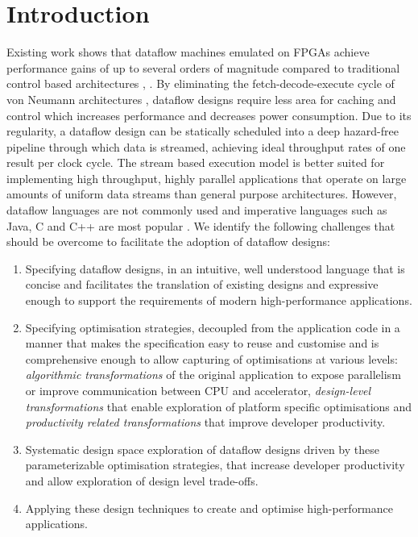 \section{Introduction}

Existing work shows that dataflow machines emulated on FPGAs achieve
performance gains of up to several orders of magnitude compared to
traditional control based architectures \cite{Flynn:Pell:Mencer:2012},
\cite{Mencer:2012}. By eliminating the fetch-decode-execute cycle of
von Neumann architectures \cite{Neumann:1993}, dataflow designs
require less area for caching and control which increases performance
and decreases power consumption. Due to its regularity, a dataflow
design can be statically scheduled into a deep hazard-free pipeline
through which data is streamed, achieving ideal throughput rates of
one result per clock cycle. The stream based execution model is better
suited for implementing high throughput, highly parallel applications
that operate on large amounts of uniform data streams than general
purpose architectures. However, dataflow languages are not commonly
used and imperative languages such as Java, C and C++ are most popular
\cite{Tiobe:2012}. We identify the following challenges that should be
overcome to facilitate the adoption of dataflow designs:
\begin{enumerate}
\item Specifying dataflow designs, in an intuitive, well understood
  language that is concise and facilitates the translation of existing
  designs and expressive enough to support the requirements of modern
  high-performance applications.
\item Specifying optimisation strategies, decoupled from the
  application code in a manner that makes the specification easy to
  reuse and customise and is comprehensive enough to allow capturing
  of optimisations at various levels: \emph{algorithmic
    transformations} of the original application to expose parallelism
  or improve communication between CPU and accelerator,
  \emph{design-level transformations} that enable exploration of
  platform specific optimisations and \emph{productivity related
    transformations} that improve developer productivity.
\item Systematic design space exploration of dataflow designs driven
  by these parameterizable optimisation strategies, that increase
  developer productivity and allow exploration of design level
  trade-offs.
\item Applying these design techniques to create and optimise
  high-performance applications.
\end{enumerate}

